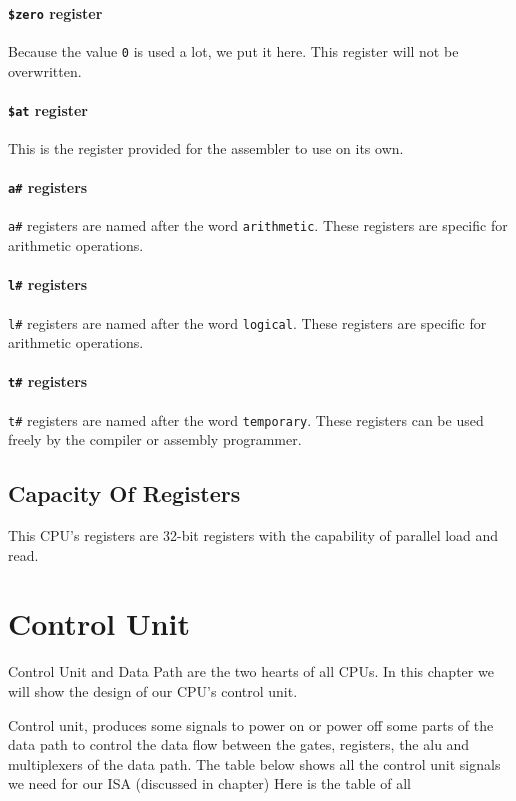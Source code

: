 \documentclass[12pt, dvipsnames, svgnames, x11names, oneside]{book}
\newenvironment{sansserif}{\sffamily}{\normalfont}
\begin{document}
\subsubsection{\texttt{\$zero} register}
Because the value \texttt{0} is used a lot, we put it here. This register will not be overwritten.
\subsubsection{\texttt{\$at} register}
This is the register provided for the assembler to use on its own.
\subsubsection{\texttt{a\#} registers}
\texttt{a\#} registers are named after the word \texttt{arithmetic}. These registers are specific for arithmetic operations.
\subsubsection{\texttt{l\#} registers}
\texttt{l\#} registers are named after the word \texttt{logical}. These registers are specific for arithmetic operations.

\subsubsection{\texttt{t\#} registers}			
\texttt{t\#} registers are named after the word \texttt{temporary}. These registers can be used freely by the compiler or assembly programmer.

\section{Capacity Of Registers}\label{sec:cap-of-regs}
This CPU's registers are 32-bit registers with the capability of parallel load and read.

\chapter{Control Unit}
\begin{sansserif}
Control Unit and Data Path are the two hearts of all CPUs. In this chapter we will show the design of our CPU's control unit.
\end{sansserif}

Control unit, produces some signals to power on or power off some parts of the data path to control the data flow between the gates, registers, the alu and multiplexers of the data path. The table below shows all the control unit signals we need for our ISA (discussed in  chapter)
Here is the table of all 
\end{document}
